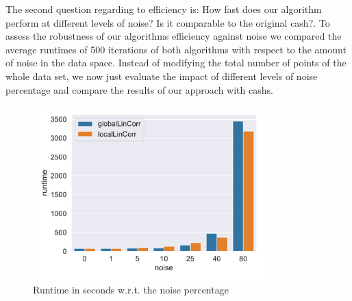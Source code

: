 The second question regarding to efficiency is: How fast does our algorithm perform at different levels of noise? Is it comparable to the original \gls{cash}?. To assess the robustness of our algorithms efficiency against noise we compared the average runtimes of 500 iterations of both algorithms with respect to the amount of noise in the data space. Instead of modifying the total number of points of the whole data set, we now just evaluate the impact of different levels of noise percentage and compare the results of our approach with \gls{cash}s.


\begin{figure}[h]
    \centering
        \includegraphics[width=0.8\textwidth]{evaluation/per_noise/Avg_Runtime_3D_O10000_pnoise_bar.pdf}
    \caption{Runtime in seconds w.r.t. the noise percentage}
    \label{fig:eval_per_noise}
\end{figure}

